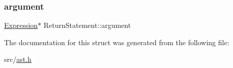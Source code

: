 \subsubsection{\texorpdfstring{argument}{argument}}
{\footnotesize\ttfamily \hyperlink{struct_expression}{Expression}$\ast$ Return\+Statement\+::argument}



The documentation for this struct was generated from the following file\+:\begin{DoxyCompactItemize}
\item 
src/\hyperlink{ast_8h}{ast.\+h}\end{DoxyCompactItemize}
